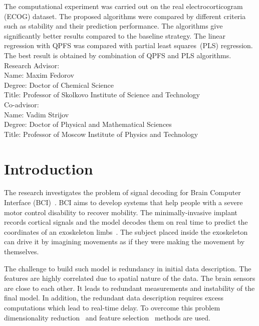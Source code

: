 \documentclass[12pt,oneside]{article}
\theoremstyle{definition}
\begin{document}
The computational experiment was carried out on the real electrocorticogram (ECOG) dataset. 
The proposed algorithms were compared by different criteria such as stability and their prediction performance.
The algorithms give significantly better results compared to the baseline strategy.
The linear regression with QPFS was compared with partial least squares~(PLS) regression.
The best result is obtained by combination of QPFS and PLS algorithms.
\\[10mm]
Research Advisor: \\
Name: Maxim Fedorov \\
Degree: Doctor of Chemical Science \\
Title: Professor of Skolkovo Institute of Science and Technology \\[5mm]
Co-advisor: \\
Name: Vadim Strijov \\
Degree: Doctor of Physical and Mathematical Sciences  \\
Title: Professor of Moscow Institute of Physics and Technology

\newpage
\tableofcontents

\newpage
\section{Introduction}
The research investigates the problem of signal decoding for Brain Computer Interface (BCI)~\cite{costecalde2018long}. 
BCI aims to develop systems that help people with a severe motor control disability to recover mobility.
The minimally-invasive implant records cortical signals and the model decodes them on real time to predict the coordinates of an exoskeleton limbs~\cite{mestais2015wimagine,eliseyev2014clinatec}.
The subject placed inside the exoskeleton can drive it by imagining movements as if they were making the movement by themselves. 

The challenge to build such model is redundancy in initial data description. 
The features are highly correlated due to spatial nature of the data. 
The brain sensors are close to each other. 
It leads to redundant measurements and instability of the final model.
In addition, the redundant data description requires excess computations which lead to real-time delay. 
To overcome this problem dimensionality reduction~\cite{chun2010sparse,mehmood2012review} and feature selection~\cite{katrutsa2015stress,li2017feature} methods are used.
\end{document}
